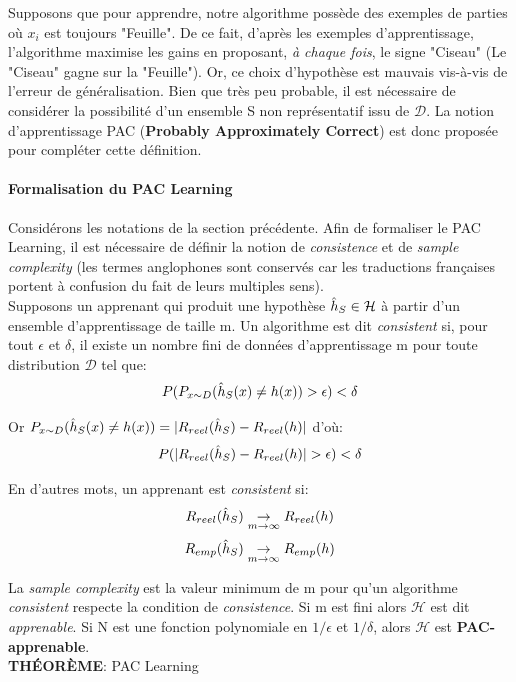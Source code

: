 \noindent Supposons que pour apprendre, notre algorithme possède des exemples de parties où $x_i$ est toujours "Feuille". De ce fait, d'après les exemples d'apprentissage, l'algorithme maximise les gains en proposant, \textit{à chaque fois}, le signe "Ciseau" (Le "Ciseau" gagne sur la "Feuille"). Or, ce choix d'hypothèse est mauvais vis-à-vis de l'erreur de généralisation. Bien que très peu probable, il est nécessaire de considérer la possibilité d'un ensemble S non représentatif issu de $\mathcal{D}$. La notion d'apprentissage PAC (\textbf{Probably Approximately Correct}) est donc proposée pour compléter cette définition.

\paragraph{Formalisation du PAC Learning}
\noindent Considérons les notations de la section précédente. Afin de formaliser le PAC Learning, il est nécessaire de définir la notion de \textit{consistence} et de \textit{sample complexity} (les termes anglophones sont conservés car les traductions françaises portent à confusion du fait de leurs multiples sens).\\

\noindent Supposons un apprenant qui produit une hypothèse $\Hat{h}_S \in \mathcal{H}$ à partir d'un ensemble d'apprentissage de taille m. Un algorithme est dit \textit{consistent} si, pour tout $\epsilon$ et $\delta$, il existe un nombre fini de données d'apprentissage m pour toute distribution $\mathcal{D}$ tel que:
$$P(P_{x \sim D} (\Hat{h}_S(x) \neq h(x)) > \epsilon) < \delta$$

\noindent Or $P_{x \sim D} (\Hat{h}_S(x) \neq h(x))=|R_{reel}(\Hat{h}_S)-R_{reel}(h)|$ d'où:
$$P(|R_{reel}(\Hat{h}_S)-R_{reel}(h)| > \epsilon) < \delta$$

\noindent En d'autres mots, un apprenant est \textit{consistent} si:
$$R_{reel}(\Hat{h}_S) \underset{m \rightarrow \infty}{\rightarrow} R_{reel}(h)$$
$$R_{emp}(\Hat{h}_S) \underset{m \rightarrow \infty}{\rightarrow} R_{emp}(h)$$

\noindent La \textit{sample complexity} est la valeur minimum de m pour qu'un algorithme \textit{consistent} respecte la condition de \textit{consistence}. Si m est fini alors $\mathcal{H}$ est dit \textit{apprenable}. Si N est une fonction polynomiale en $1/\epsilon$ et $1/\delta$, alors $\mathcal{H}$ est \textbf{PAC-apprenable}.\\

\noindent \textbf{THÉORÈME}: PAC Learning\\

